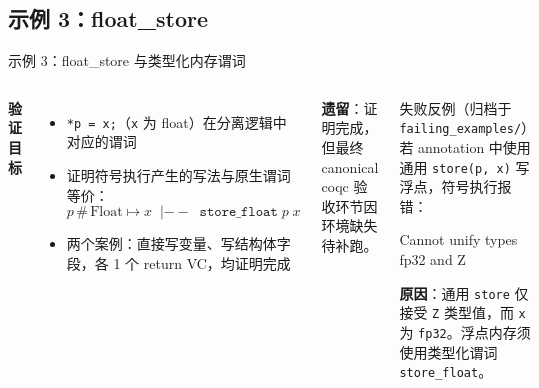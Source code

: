 \documentclass[UTF8,aspectratio=169]{ctexbeamer}
\begin{document}
\subsection{示例 3：float\_store}
\begin{frame}{示例 3：float\_store 与类型化内存谓词}
  \begin{columns}[T]
    \textbf{验证目标}
    \begin{itemize}\small
      \item \texttt{*p = x;}（\texttt{x} 为 float）在分离逻辑中对应的谓词
      \item 证明符号执行产生的写法与原生谓词等价：
      $$ p\,\#\,\text{Float} \mapsto x \;\;|-\!\!-\;\; \texttt{store\_float}\;p\;x $$
      \item 两个案例：直接写变量、写结构体字段，各 1 个 return VC，均证明完成
    \end{itemize}
    \textbf{遗留}：证明完成，但最终 canonical coqc 验收环节因环境缺失待补跑。
    \begin{block}{失败反例（归档于 \texttt{failing\_examples/}）}
      \small 若 annotation 中使用通用 \texttt{store(p, x)} 写浮点，符号执行报错：
      \begin{center}\footnotesize\ttfamily
        Cannot unify types fp32 and Z
      \end{center}
      \textbf{原因}：通用 \texttt{store} 仅接受 \texttt{Z} 类型值，而 \texttt{x} 为 \texttt{fp32}。浮点内存须使用类型化谓词 \texttt{store\_float}。
    \end{block}
  \end{columns}
\end{frame}
\end{document}
